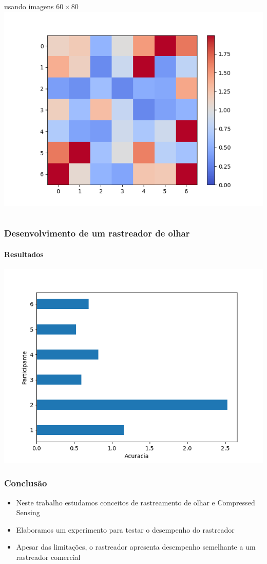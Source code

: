 \documentclass[11pt]{beamer}
\begin{document}
\begin{frame}
\begin{columns}[t]
\centering
\tiny{usando imagens $60 \times 80$}
\includegraphics[scale=.25]{imagens/erros3pyrDown.png}
\end{columns}
\end{frame}

\begin{frame}
\frametitle{Desenvolvimento de um rastreador de olhar}
\framesubtitle{Resultados}

\includegraphics[scale=.65]{imagens/errosParticipantes_pyrDown3.png}
\end{frame}

\begin{frame}
\frametitle{Conclusão}
\begin{itemize}
\item Neste trabalho estudamos conceitos de rastreamento de olhar e Compressed Sensing
\item Elaboramos um experimento para testar o desempenho do rastreador
\item Apesar das limitações, o rastreador apresenta desempenho semelhante a um rastreador comercial
\end{itemize}
\end{frame}
\end{document}

